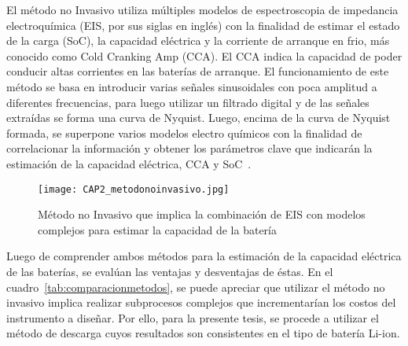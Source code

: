 El método no Invasivo utiliza múltiples modelos de espectroscopia de impedancia electroquímica (EIS, por sus siglas en inglés) con la finalidad de estimar el estado de la carga (SoC), la capacidad eléctrica y la corriente de arranque en frio, más conocido como Cold Cranking Amp (CCA). El CCA indica la capacidad de poder conducir altas corrientes en las baterías de arranque. El funcionamiento de este método se basa en introducir varias señales sinusoidales con poca amplitud a diferentes frecuencias, para luego utilizar un filtrado digital y de las señales extraídas se forma una curva de Nyquist. Luego, encima de la curva de Nyquist formada, se superpone varios modelos electro químicos con la finalidad de correlacionar la información y obtener los parámetros clave que indicarán la estimación de la capacidad eléctrica, CCA y SoC~\cite{measurecapacity}. 

\begin{figure}[htbp]
\begin{center}
\texttt{[image: CAP2\_metodonoinvasivo.jpg]}
\caption{Método no Invasivo que implica la combinación de EIS con modelos complejos para estimar la capacidad de la batería~\cite{measurecapacity}}
\label{fig:metodonoinvasivo}
\end{center}
\end{figure}

Luego de comprender ambos métodos para la estimación de la capacidad eléctrica de las baterías, se evalúan las ventajas y desventajas de éstas. En el cuadro~\ref{tab:comparacionmetodos}, se puede apreciar que utilizar el método no invasivo implica realizar subprocesos complejos que incrementarían los costos del instrumento a diseñar. Por ello, para la presente tesis, se procede a utilizar el método de descarga cuyos resultados son consistentes en el tipo de batería Li-ion.

